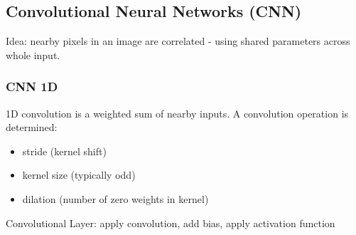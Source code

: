  \subsection{Convolutional Neural Networks (CNN)}
 Idea: nearby pixels in an image are correlated - using shared parameters across whole input.
\subsubsection{CNN 1D}
1D convolution is a weighted sum of nearby inputs.
A convolution operation is determined:
\begin{itemize}
    \item stride (kernel shift)
    \item kernel size (typically odd)
    \item dilation (number of zero weights in kernel)
\end{itemize}
Convolutional Layer: apply convolution, add bias, apply activation function